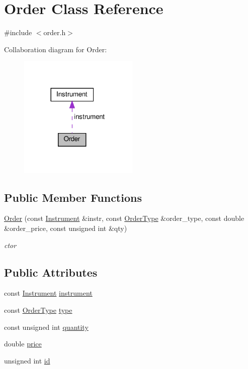 \hypertarget{classOrder}{}\section{Order Class Reference}
\label{classOrder}


{\ttfamily \#include $<$order.\+h$>$}



Collaboration diagram for Order\+:
\nopagebreak
\begin{figure}[H]
\begin{center}
\leavevmode
\includegraphics[width=161pt]{classOrder__coll__graph}
\end{center}
\end{figure}
\subsection*{Public Member Functions}
\begin{DoxyCompactItemize}
\item 
\hyperlink{classOrder_a936dad01587c163c6f697c5f3b6406bb}{Order} (const \hyperlink{classInstrument}{Instrument} \&instr, const \hyperlink{order_8h_a57124e387290311f33f3b54a54930418}{Order\+Type} \&order\+\_\+type, const double \&order\+\_\+price, const unsigned int \&qty)
\begin{DoxyCompactList}\small\item\em ctor \end{DoxyCompactList}\end{DoxyCompactItemize}
\subsection*{Public Attributes}
\begin{DoxyCompactItemize}
\item 
const \hyperlink{classInstrument}{Instrument} \hyperlink{classOrder_a34659d82ec58efd7a249c8412be5a8c2}{instrument}
\item 
const \hyperlink{order_8h_a57124e387290311f33f3b54a54930418}{Order\+Type} \hyperlink{classOrder_a131d51d58056d8e34b200b3661d091f2}{type}
\item 
const unsigned int \hyperlink{classOrder_a77525cd65ce276fb5dce2177de41f33f}{quantity}
\item 
double \hyperlink{classOrder_a22df57af82ecda59bd0ed1f7534a170b}{price}
\item 
unsigned int \hyperlink{classOrder_a78c189ccb42636fd4e3e88f6e9d756e4}{id}
\end{DoxyCompactItemize}


